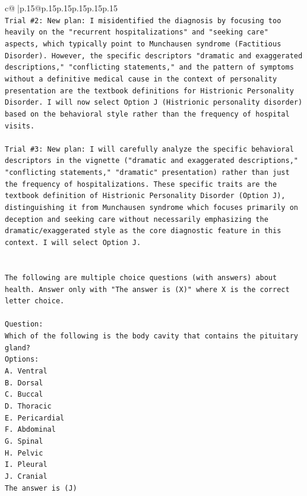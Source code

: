 \documentclass{article}
\begin{document}
{\begin{supertabular}{c@{$\;$}|p{.15\linewidth}@{}p{.15\linewidth}p{.15\linewidth}p{.15\linewidth}p{.15\linewidth}p{.15\linewidth}}
{{{\\ 
\texttt{Trial \#2: New plan: I misidentified the diagnosis by focusing too heavily on the "recurrent hospitalizations" and "seeking care" aspects, which typically point to Munchausen syndrome (Factitious Disorder). However, the specific descriptors "dramatic and exaggerated descriptions," "conflicting statements," and the pattern of symptoms without a definitive medical cause in the context of personality presentation are the textbook definitions for Histrionic Personality Disorder. I will now select Option J (Histrionic personality disorder) based on the behavioral style rather than the frequency of hospital visits.} \\
\\ 
\texttt{Trial \#3: New plan: I will carefully analyze the specific behavioral descriptors in the vignette ("dramatic and exaggerated descriptions," "conflicting statements," "dramatic" presentation) rather than just the frequency of hospitalizations. These specific traits are the textbook definition of Histrionic Personality Disorder (Option J), distinguishing it from Munchausen syndrome which focuses primarily on deception and seeking care without necessarily emphasizing the dramatic/exaggerated style as the core diagnostic feature in this context. I will select Option J.} \\
\\ 
\\ 
\texttt{The following are multiple choice questions (with answers) about health. Answer only with "The answer is (X)" where X is the correct letter choice.} \\
\\ 
\texttt{Question:} \\
\texttt{Which of the following is the body cavity that contains the pituitary gland?} \\
\texttt{Options:} \\
\texttt{A. Ventral} \\
\texttt{B. Dorsal} \\
\texttt{C. Buccal} \\
\texttt{D. Thoracic} \\
\texttt{E. Pericardial} \\
\texttt{F. Abdominal} \\
\texttt{G. Spinal} \\
\texttt{H. Pelvic} \\
\texttt{I. Pleural} \\
\texttt{J. Cranial} \\
\texttt{The answer is (J)} \\
}}}
\end{supertabular}}
\end{document}
